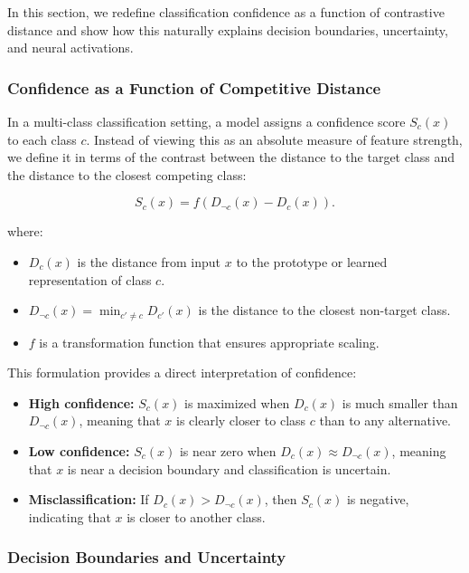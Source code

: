 \documentclass[12pt]{article}
\begin{document}
In this section, we redefine classification confidence as a function of contrastive distance and show how this naturally explains decision boundaries, uncertainty, and neural activations.

\subsubsection{Confidence as a Function of Competitive Distance}

In a multi-class classification setting, a model assigns a confidence score \( S_c(x) \) to each class \( c \). Instead of viewing this as an absolute measure of feature strength, we define it in terms of the contrast between the distance to the target class and the distance to the closest competing class:

\[
S_c(x) = f(D_{\neg c}(x) - D_c(x)).
\]

where:

\begin{itemize}
    \item \( D_c(x) \) is the distance from input \( x \) to the prototype or learned representation of class \( c \).
    \item \( D_{\neg c}(x) = \min_{c' \neq c} D_{c'}(x) \) is the distance to the closest non-target class.
    \item \( f \) is a transformation function that ensures appropriate scaling.
\end{itemize}

This formulation provides a direct interpretation of confidence:

\begin{itemize}
    \item \textbf{High confidence:} \( S_c(x) \) is maximized when \( D_c(x) \) is much smaller than \( D_{\neg c}(x) \), meaning that \( x \) is clearly closer to class \( c \) than to any alternative.
    \item \textbf{Low confidence:} \( S_c(x) \) is near zero when \( D_c(x) \approx D_{\neg c}(x) \), meaning that \( x \) is near a decision boundary and classification is uncertain.
    \item \textbf{Misclassification:} If \( D_c(x) > D_{\neg c}(x) \), then \( S_c(x) \) is negative, indicating that \( x \) is closer to another class.
\end{itemize}

\subsubsection{Decision Boundaries and Uncertainty}
\end{document}
